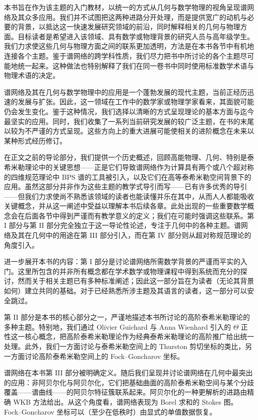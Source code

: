 本书旨在作为该主题的入门教材，以统一的方式从几何与数学物理的视角呈现谱网络及其众多应用。我们并不试图把这两种进路分开处理，而是提供宽广的动机与必要的背景，以抵达这一快速发展研究领域的前沿，同时解释相关的几何与物理方面。目标读者是希望进入该领域、具有数学或物理背景的研究人员与高年级学生。我们力求使这些几何与物理方面之间的联系更加透明，方法是在本书各节中有机地连接各个主题。鉴于谱网络的跨学科性质，我们尽力把书中所讨论的各个主题尽可能地统一起来。这种做法也特别解释了我们在同一卷书中同时使用标准数学术语与物理术语的决定。

谱网络及其在几何与数学物理中的应用是一个蓬勃发展的现代主题，当前正经历迅速的发展与扩张。因此，这一领域在工作中的数学家或物理学家看来，其面貌可能仍会发生变化。鉴于这种情况，我们选择以清晰的方式呈现理论的基本方面与迄今最坚实的应用。同时，我们收集了一系列当前研究发展的较广泛主题，在书的末尾以较为不严谨的方式呈现。这些方向上的重大进展可能使相关的进阶概念在未来以某种形式经历修订。

在正文之前的导论部分，我们提供一个历史概述，回顾高能物理、几何、特别是泰希米勒理论中的关键思想——正是它们导致谱网络作为计算具有两个或八个超对称的四维规范理论中 BPS 谱的工具被引入，以及它们在高等泰希米勒空间背景下的应用。虽然这部分并非作为这些主题的教学式导引而写——已有许多优秀的导引——但我们力求使尚不熟悉该领域的读者也能读懂并乐在其中，从而人人都能吸收关键概念，并从这一阐述中受益以理解本书后续各章。此处出现的一些重要数学概念会在后面各节中得到严谨而有教学意义的定义；我们在可能时强调这些联系。第 I 部分与第 II 部分完全独立于这一导论性论述，专注于几何中的各种主题。谱网络及其在几何中的用途在第 III 部分引入，而在第 IV 部分则从超对称规范理论的角度引入。

进一步展开本书的内容：第 I 部分是讨论谱网络所需数学背景的严谨而平实的入门。这里所包含的并非所有概念都在学术数学或物理课程中得到系统而充分的探讨，然而关于相关主题已有多种标准阐述；因此这一部分旨在为读者（无论其背景如何）建立共同的基础。对于已经熟悉所涉主题及其语言的读者，这一部分可以安全跳过。

第 II 部分是本书的核心部分之一，严谨地描述本书所讨论的高阶泰希米勒理论的多种主题。特别地，我们通过 Olivier Guichard 与 Anna Wienhard 引入的 $\Theta$ 正性这一核心概念，把高阶泰希米勒理论作为经典泰希米勒理论的高阶推广给出统一处理。此外，我们一方面讨论与泰希米勒空间上的 Thurston 剪切坐标的类比，另一方面讨论高阶泰希米勒空间上的 Fock–Goncharov 坐标。

谱网络在本书第 III 部分被明确定义。随后我们呈现并讨论谱网络在几何中最突出的应用：非阿贝尔化与阿贝尔化，它们把基础曲面的高阶泰希米勒空间与某个分歧覆盖——谱曲线——的阿贝尔特征簇联系起来。阿贝尔化的一种更解析的进路由精确 WKB 方法给出。从这个角度看，谱网络表现为 Borel 求和的 Stokes 图。Fock–Goncharov 坐标可以（至少在低秩时）由显式的单值数据恢复。

